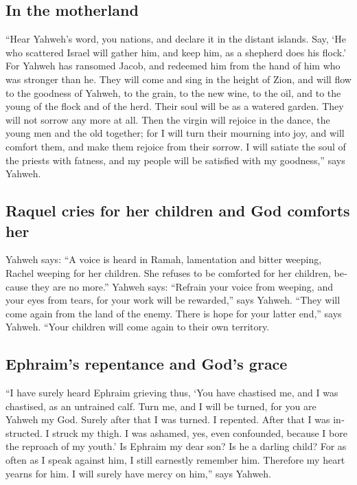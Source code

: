 \begin{paracol}{2}
\begin{otherlanguage}{english}
\hypertarget{in-the-motherland}{%
\subsection{In the motherland}\label{in-the-motherland}}

 ``Hear Yahweh's word, you nations, and declare it in the
distant islands. Say, `He who scattered Israel will gather him, and keep
him, as a shepherd does his flock.'  For Yahweh has
ransomed Jacob, and redeemed him from the hand of him who was stronger
than he.  They will come and sing in the height of Zion,
and will flow to the goodness of Yahweh, to the grain, to the new wine,
to the oil, and to the young of the flock and of the herd. Their soul
will be as a watered garden. They will not sorrow any more at all.
 Then the virgin will rejoice in the dance, the young men
and the old together; for I will turn their mourning into joy, and will
comfort them, and make them rejoice from their sorrow.  I
will satiate the soul of the priests with fatness, and my people will be
satisfied with my goodness,'' says Yahweh.

\hypertarget{raquel-cries-for-her-children-and-god-comforts-her}{%
\subsection{Raquel cries for her children and God comforts
her}\label{raquel-cries-for-her-children-and-god-comforts-her}}

 Yahweh says: ``A voice is heard in Ramah, lamentation
and bitter weeping, Rachel weeping for her children. She refuses to be
comforted for her children, because they are no more.'' 
Yahweh says: ``Refrain your voice from weeping, and your eyes from
tears, for your work will be rewarded,'' says Yahweh. ``They will come
again from the land of the enemy.  There is hope for your
latter end,'' says Yahweh. ``Your children will come again to their own
territory.

\hypertarget{ephraims-repentance-and-gods-grace}{%
\subsection{Ephraim's repentance and God's
grace}\label{ephraims-repentance-and-gods-grace}}

 ``I have surely heard Ephraim grieving thus, `You have
chastised me, and I was chastised, as an untrained calf. Turn me, and I
will be turned, for you are Yahweh my God.  Surely after
that I was turned. I repented. After that I was instructed. I struck my
thigh. I was ashamed, yes, even confounded, because I bore the reproach
of my youth.'  Is Ephraim my dear son? Is he a darling
child? For as often as I speak against him, I still earnestly remember
him. Therefore my heart yearns for him. I will surely have mercy on
him,'' says Yahweh.


\end{otherlanguage}
\end{paracol}
